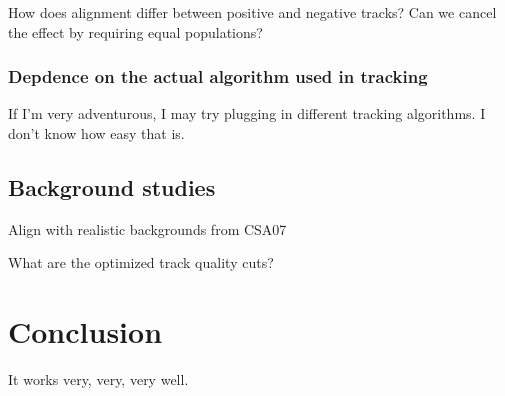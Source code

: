 \documentclass[12pt]{article}
\begin{document}
How does alignment differ between positive and negative
tracks?  Can we cancel the effect by requiring equal
populations?

\subsubsection{Depdence on the actual algorithm used in tracking}

If I'm very adventurous, I may try plugging in different
tracking algorithms.  I don't know how easy that is.

\subsection{Background studies}

Align with realistic backgrounds from CSA07

What are the optimized track quality cuts?

\section{Conclusion}

It works very, very, very well.
\end{document}

